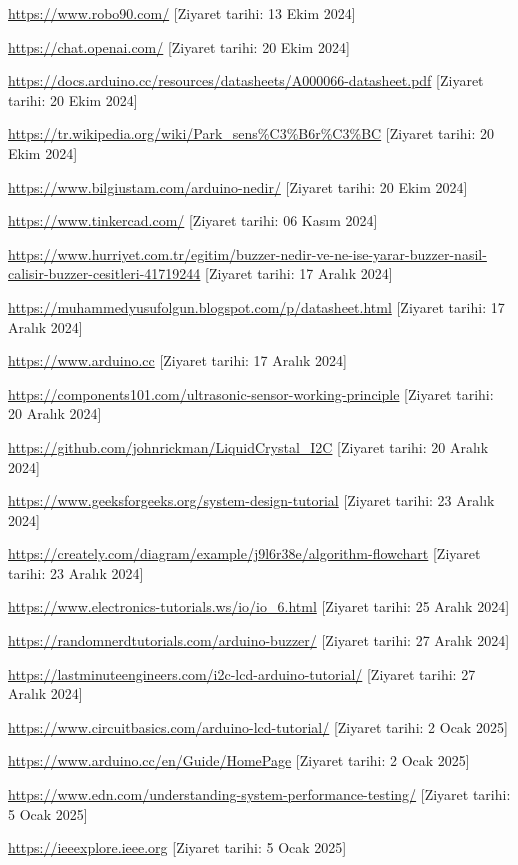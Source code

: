 \renewcommand{\refname}{KAYNAKLAR}
\begin{thebibliography}{99}

 \url{https://www.robo90.com/} [Ziyaret tarihi: 13 Ekim 2024]

 \url{https://chat.openai.com/} [Ziyaret tarihi: 20 Ekim 2024]

 \url{https://docs.arduino.cc/resources/datasheets/A000066-datasheet.pdf} [Ziyaret tarihi: 20 Ekim 2024]

 \url{https://tr.wikipedia.org/wiki/Park_sens%C3%B6r%C3%BC} [Ziyaret tarihi: 20 Ekim 2024]

 \url{https://www.bilgiustam.com/arduino-nedir/} [Ziyaret tarihi: 20 Ekim 2024]

 \url{https://www.tinkercad.com/} [Ziyaret tarihi: 06 Kasım 2024]

 \url{https://www.hurriyet.com.tr/egitim/buzzer-nedir-ve-ne-ise-yarar-buzzer-nasil-calisir-buzzer-cesitleri-41719244} [Ziyaret tarihi: 17 Aralık 2024]

\url{https://muhammedyusufolgun.blogspot.com/p/datasheet.html} [Ziyaret tarihi: 17 Aralık 2024]


 \url{https://www.arduino.cc} [Ziyaret tarihi: 17 Aralık 2024]

 \url{https://components101.com/ultrasonic-sensor-working-principle} [Ziyaret tarihi: 20 Aralık 2024]

 \url{https://github.com/johnrickman/LiquidCrystal_I2C} [Ziyaret tarihi: 20 Aralık 2024]

 \url{https://www.geeksforgeeks.org/system-design-tutorial} [Ziyaret tarihi: 23 Aralık 2024]

 \url{https://creately.com/diagram/example/j9l6r38e/algorithm-flowchart} [Ziyaret tarihi: 23 Aralık 2024]

 \url{https://www.electronics-tutorials.ws/io/io_6.html} [Ziyaret tarihi: 25 Aralık 2024]

 \url{https://randomnerdtutorials.com/arduino-buzzer/} [Ziyaret tarihi: 27 Aralık 2024]

 \url{https://lastminuteengineers.com/i2c-lcd-arduino-tutorial/} [Ziyaret tarihi: 27 Aralık 2024]

 \url{https://www.circuitbasics.com/arduino-lcd-tutorial/} [Ziyaret tarihi: 2 Ocak 2025]

 \url{https://www.arduino.cc/en/Guide/HomePage} [Ziyaret tarihi: 2 Ocak 2025]

 \url{https://www.edn.com/understanding-system-performance-testing/} [Ziyaret tarihi: 5 Ocak 2025]

 \url{https://ieeexplore.ieee.org} [Ziyaret tarihi: 5 Ocak 2025]






\end{thebibliography}